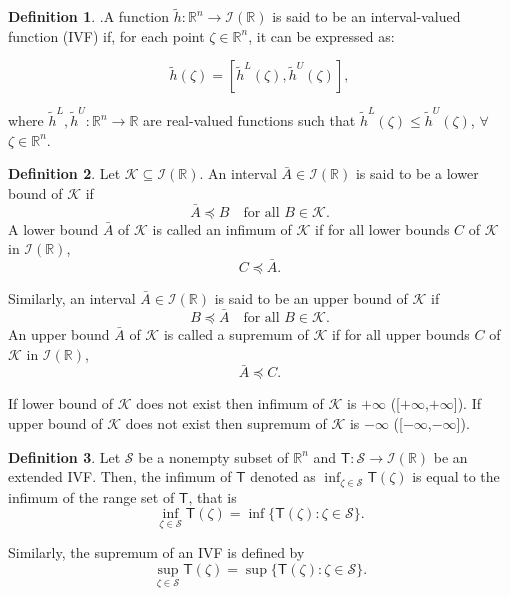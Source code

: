 \documentclass[12pt, reqno]{amsart}
\theoremstyle{definition}
\newtheorem{definition}{Definition}[section]
\theoremstyle{remark}
\numberwithin{equation}{section}
\begin{document}

\begin{definition} \cite{Wu2007}.A function \( \tilde{h}: \mathbb{R}^n \to \mathcal{I}(\mathbb{R}) \) is said to be an interval-valued function (IVF) if, for each point \( \mathit{\zeta}  \in \mathbb{R}^n \), it can be expressed as:

\[
\tilde{h}(\mathit{\zeta} ) = \left[\tilde{h}^L(\mathit{\zeta} ), \tilde{h}^U(\mathit{\zeta} )\right],
\]

where \( \tilde{h}^L, \tilde{h}^U : \mathbb{R}^n \rightarrow \mathbb{R} \) are real-valued functions such that \( \tilde{h}^L(\mathit{\zeta} ) \leq \tilde{h}^U(\mathit{\zeta} ) \), $\forall$ \( \mathit{\zeta}  \in \mathbb{R}^n \).
\end{definition} 

\begin{definition} \cite{KumarandGhosh}
    Let $\mathcal{K} \subseteq \mathcal{I}(\mathbb{R})$. An interval $\bar{A} \in \mathcal{I}(\mathbb{R})$ is said to be a lower bound of $\mathcal{K}$ if 
\[
\bar{A} \preceq B \quad \text{for all } B \in \mathcal{K}.
\]
A lower bound $\bar{A}$ of $\mathcal{K}$ is called an infimum of $\mathcal{K}$ if for all lower bounds $C$ of $\mathcal{K}$ in $\mathcal{I}(\mathbb{R})$,
\[
C \preceq \bar{A}.
\]

Similarly, an interval $\bar{A} \in \mathcal{I}(\mathbb{R})$ is said to be an upper bound of $\mathcal{K}$ if 
\[
B \preceq \bar{A} \quad \text{for all } B \in \mathcal{K}.
\]
An upper bound $\bar{A}$ of $\mathcal{K}$ is called a supremum of $\mathcal{K}$ if for all upper bounds $C$ of $\mathcal{K}$ in $\mathcal{I}(\mathbb{R})$,
\[
\bar{A} \preceq C.
\]
\end{definition}
If lower bound of $\mathcal{K}$ does not exist then infimum of $\mathcal{K}$ is $+\infty$ ([$+\infty$,$+\infty$]).
If upper bound of $\mathcal{K}$ does not exist then supremum of $\mathcal{K}$ is $-\infty$ ([$-\infty$,$-\infty$]).
\begin{definition}\cite{KumarandGhosh}
Let $\mathcal{S}$ be a nonempty subset of $\mathbb{R}^n $ and 
$\mathsf{T} : \mathcal{S} \to {\mathcal{I}(\mathbb{R})}$
be an extended IVF. Then, the infimum of $\mathsf{T}$ denoted as 
$\inf_{\zeta \in \mathcal{S}} \mathsf{T}(\zeta)$
is equal to the infimum of the range set of $\mathsf{T}$, that is
\[
\inf_{\zeta \in \mathcal{S}} \mathsf{T}(\zeta)
    = \inf\{\mathsf{T}(\zeta) : \zeta \in \mathcal{S}\}.
\]

Similarly, the supremum of an IVF is defined by
\[
\sup_{\zeta \in \mathcal{S}} \mathsf{T}(\zeta)
    = \sup\{\mathsf{T}(\zeta) : \zeta \in \mathcal{S}\}.
\]
\end{definition}
\end{document}
